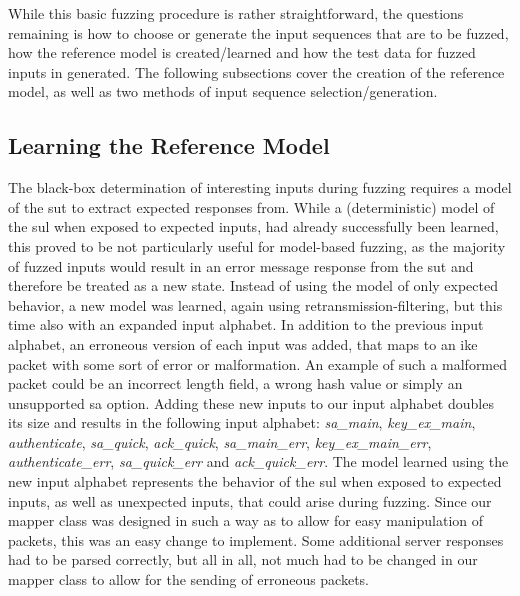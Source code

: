 While this basic fuzzing procedure is rather straightforward, the questions remaining is how to choose or generate the input sequences that are to be fuzzed, how the reference model is created/learned and how the test data for fuzzed inputs in generated. The following subsections cover the creation of the reference model, as well as two methods of input sequence selection/generation.

\subsection{Learning the Reference Model} \label{subsec:adapting_model}
The black-box determination of interesting inputs during fuzzing requires a model of the \ac{sut} to extract expected responses from. While a (deterministic) model of the \ac{sul} when exposed to expected inputs, had already successfully been learned, this proved to be not particularly useful for model-based fuzzing, as the majority of fuzzed inputs would result in an error message response from the \ac{sut} and therefore be treated as a new state. Instead of using the model of only expected behavior, a new model was learned, again using retransmission-filtering, but this time also with an expanded input alphabet. In addition to the previous input alphabet, an erroneous version of each input was added, that maps to an \ac{ike} packet with some sort of error or malformation. An example of such a malformed packet could be an incorrect length field, a wrong hash value or simply an unsupported \ac{sa} option. Adding these new inputs to our input alphabet doubles its size and results in the following input alphabet: \emph{sa\_main}, \emph{key\_ex\_main}, \emph{authenticate}, \emph{sa\_quick}, \emph{ack\_quick}, \emph{sa\_main\_err}, \emph{key\_ex\_main\_err}, \emph{authenticate\_err}, \emph{sa\_quick\_err} and \emph{ack\_quick\_err}. The model learned using the new input alphabet represents the behavior of the \ac{sul} when exposed to expected inputs, as well as unexpected inputs, that could arise during fuzzing. Since our mapper class was designed in such a way as to allow for easy manipulation of packets, this was an easy change to implement. Some additional server responses had to be parsed correctly, but all in all, not much had to be changed in our mapper class to allow for the sending of erroneous packets. 


